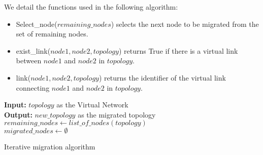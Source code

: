 We detail the functions used in the following algorithm:
\begin{itemize}
\item Select\_node($remaining\_nodes$) selects the next node to be migrated from the set of remaining nodes.
\item exist\_link($node1,node2,topology$) returns True if there is a virtual link between $node1$ and $node2$ in $topology$.
\item link($node1,node2,topology$) returns the identifier of the virtual link connecting $node1$ and $node2$ in $topology$.
\end{itemize}

\begin{algorithm}[ht]
\textbf{Input: }$topology$ as the Virtual Network\\
\textbf{Output: } $new\_topology$ as the migrated topology\\
 $remaining\_nodes \gets list\_of\_nodes(topology)$\\
 $migrated\_nodes \gets \emptyset$\\
\caption{Iterative migration algorithm}
\label{algo:iterative_algo}
\end{algorithm}
